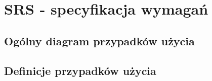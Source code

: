 \chapter{SRS - specyfikacja wymagań}

\section{Ogólny diagram przypadków użycia}


\section{Definicje przypadków użycia}
